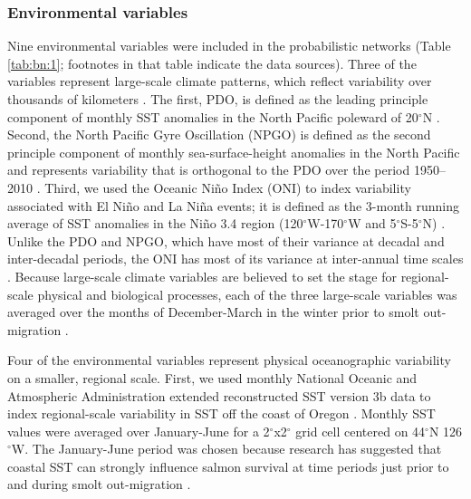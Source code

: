 \subsubsection{Environmental variables}

Nine environmental variables were included in the probabilistic networks (Table
\ref{tab:bn:1}; footnotes in that table indicate the data sources). Three of the
variables represent large-scale climate patterns, which reflect variability over
thousands of kilometers \citep{King2011}. The first, PDO, is defined as the
leading principle component of monthly SST anomalies in the North Pacific
poleward of 20$^{\circ}$N \citep{Mantua1997a}.  Second, the North Pacific Gyre
Oscillation (NPGO) is defined as the second principle component of monthly
sea-surface-height anomalies in the North Pacific and represents variability
that is orthogonal to the PDO over the period 1950--2010
\citep{Di-Lorenzo2008a}. Third, we used the Oceanic Ni\~{n}o Index (ONI) to
index variability associated with El Ni\~{n}o and La Ni\~{n}a events; it is
defined as the 3-month running average of SST anomalies in the Ni\~{n}o 3.4
region (120$^{\circ}$W-170$^{\circ}$W and 5$^{\circ}$S-5$^{\circ}$N)
\citep{Trenberth1997}. Unlike the PDO and NPGO, which have most of their
variance at decadal and inter-decadal periods, the ONI has most of its variance
at inter-annual time scales \citep{Sarachik2010a}. Because large-scale climate
variables are believed to set the stage for regional-scale physical and
biological processes, each of the three large-scale variables was averaged over
the months of December-March in the winter prior to smolt out-migration
\citep{Mantua1997a, Yeh2011, DiLorenzo2013a}.

Four of the environmental variables represent physical oceanographic variability
on a smaller, regional scale. First, we used monthly National Oceanic and
Atmospheric Administration extended reconstructed SST version 3b data to index
regional-scale variability in SST off the coast of Oregon \citep{Smith2008a}.
Monthly SST values were averaged over January-June for a 2$^{\circ}$x2$^{\circ}$
grid cell centered on 44$^{\circ}$N 126$^{\circ}$W. The January-June period was
chosen because research has suggested that coastal SST can strongly influence
salmon survival at time periods just prior to and during smolt out-migration
\citep{Mueter2005a}.

